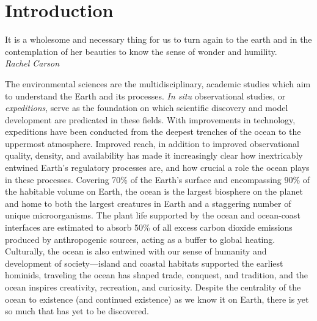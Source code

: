\chapter{Introduction}
\label{chap:intro}

\begin{center}
    \begin{minipage}{0.7\textwidth}
      \begin{small}
       It is a wholesome and necessary thing for us to turn again to the earth and in the contemplation of her beauties to know the sense of wonder and humility.\\ \emph{Rachel Carson}
      \end{small}
    \end{minipage}
    \vspace{0.5cm}
\end{center}



The environmental sciences are the multidisciplinary, academic studies which aim to understand the Earth and its processes.
\emph{In situ} observational studies, or \emph{expeditions}, serve as the foundation on which scientific discovery and model development are predicated in these fields.
With improvements in technology, expeditions have been conducted from the deepest trenches of the ocean to the uppermost atmosphere.
Improved reach, in addition to improved observational quality, density, and availability has made it increasingly clear how inextricably entwined Earth's regulatory processes are, and how crucial a role the ocean plays in these processes.
Covering 70\% of the Earth's surface and encompassing 90\% of the habitable volume on Earth, the ocean is the largest biosphere on the planet and home to both the largest creatures in Earth and a staggering number of unique microorganisms\autocite{cario2019exploring,purkis2022remote}.
The plant life supported by the ocean and ocean-coast interfaces are estimated to absorb 50\% of all excess carbon dioxide emissions produced by anthropogenic sources, acting as a buffer to global heating\autocite{hori2019blue}.
Culturally, the ocean is also entwined with our sense of humanity and development of society---island and coastal habitats supported the earliest hominids\autocite{erlandson2006oceans}, traveling the ocean has shaped trade, conquest, and tradition\autocite{pearson2003indian,chaudhuri1985trade,firth2019understanding,nunn2003nature}, and the ocean inspires creativity, recreation, and curiosity.
Despite the centrality of the ocean to existence (and continued existence) as we know it on Earth, there is yet so much that has yet to be discovered.

